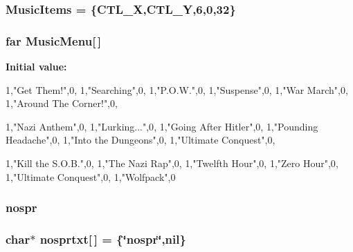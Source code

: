 \label{WL__MAIN_8C_a8dcec22af342ab93acb6d66d85b69140}
\hypertarget{WL__MAIN_8C_a6e6e340c87aac09f698443f10add2d51}{
\subsubsection[{MusicItems}]{ {\bf MusicItems} = \{CTL\_\-X,CTL\_\-Y,6,0,32\}}}
\label{WL__MAIN_8C_a6e6e340c87aac09f698443f10add2d51}
\hypertarget{WL__MAIN_8C_adcf7140c950b56fed629f6553542555f}{
\subsubsection[{MusicMenu}]{ far {\bf MusicMenu}\mbox{[}$\,$\mbox{]}}}
\label{WL__MAIN_8C_adcf7140c950b56fed629f6553542555f}
{\bfseries Initial value:}
\begin{DoxyCode}

        {
                {1,"Get Them!",0},
                {1,"Searching",0},
                {1,"P.O.W.",0},
                {1,"Suspense",0},
                {1,"War March",0},
                {1,"Around The Corner!",0},

                {1,"Nazi Anthem",0},
                {1,"Lurking...",0},
                {1,"Going After Hitler",0},
                {1,"Pounding Headache",0},
                {1,"Into the Dungeons",0},
                {1,"Ultimate Conquest",0},

                {1,"Kill the S.O.B.",0},
                {1,"The Nazi Rap",0},
                {1,"Twelfth Hour",0},
                {1,"Zero Hour",0},
                {1,"Ultimate Conquest",0},
                {1,"Wolfpack",0}
        }
\end{DoxyCode}
\hypertarget{WL__MAIN_8C_a6910c9b4b0337ce17f4ea6c2260721bf}{
\subsubsection[{nospr}]{ {\bf nospr}}}
\label{WL__MAIN_8C_a6910c9b4b0337ce17f4ea6c2260721bf}
\hypertarget{WL__MAIN_8C_aff857ab1c5f74eb9b19dffcad87e4dcb}{
\subsubsection[{nosprtxt}]{\setlength{\rightskip}{0pt plus 5cm}char$\ast$ {\bf nosprtxt}\mbox{[}$\,$\mbox{]} = \{\char`\"{}nospr\char`\"{},nil\}}}

